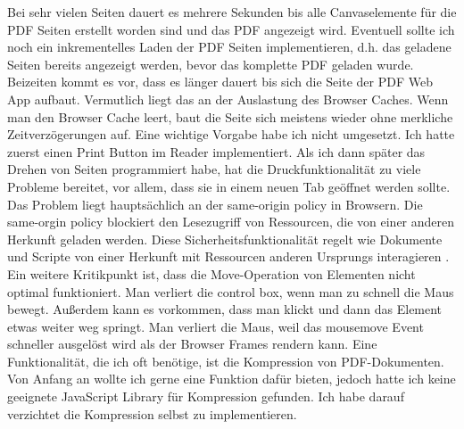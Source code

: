 Bei sehr vielen Seiten dauert es mehrere Sekunden bis alle Canvaselemente für die PDF Seiten erstellt worden sind und das PDF angezeigt wird. Eventuell sollte ich noch ein inkrementelles Laden der PDF Seiten implementieren, d.h. das geladene Seiten bereits angezeigt werden, bevor das komplette PDF geladen wurde. Beizeiten kommt es vor, dass es länger dauert bis sich die Seite der PDF Web App aufbaut. Vermutlich liegt das an der Auslastung des Browser Caches. Wenn man den Browser Cache leert, baut die Seite sich meistens wieder ohne merkliche Zeitverzögerungen auf. Eine wichtige Vorgabe habe ich nicht umgesetzt. Ich hatte zuerst einen Print Button im Reader implementiert. Als ich dann später das Drehen von Seiten programmiert habe, hat die Druckfunktionalität zu viele Probleme bereitet, vor allem, dass sie in einem neuen Tab geöffnet werden sollte. Das Problem liegt hauptsächlich an der same-origin policy in Browsern. Die same-orgin policy blockiert den Lesezugriff von Ressourcen, die von einer anderen Herkunft geladen werden. Diese Sicherheitsfunktionalität regelt wie Dokumente und Scripte von einer Herkunft mit Ressourcen anderen Ursprungs interagieren \cite{same-origin}. Ein weitere Kritikpunkt ist, dass die Move-Operation von Elementen nicht optimal funktioniert. Man verliert die control box, wenn man zu schnell die Maus bewegt. Außerdem kann es vorkommen, dass man klickt und dann das Element etwas weiter weg springt. Man verliert die Maus, weil das mousemove Event schneller ausgelöst wird als der Browser Frames rendern kann. \cite{lawson} Eine Funktionalität, die ich oft benötige, ist die Kompression von PDF-Dokumenten. Von Anfang an wollte ich gerne eine Funktion dafür bieten, jedoch hatte ich keine geeignete JavaScript Library für Kompression gefunden. Ich habe darauf verzichtet die Kompression selbst zu implementieren. \\
